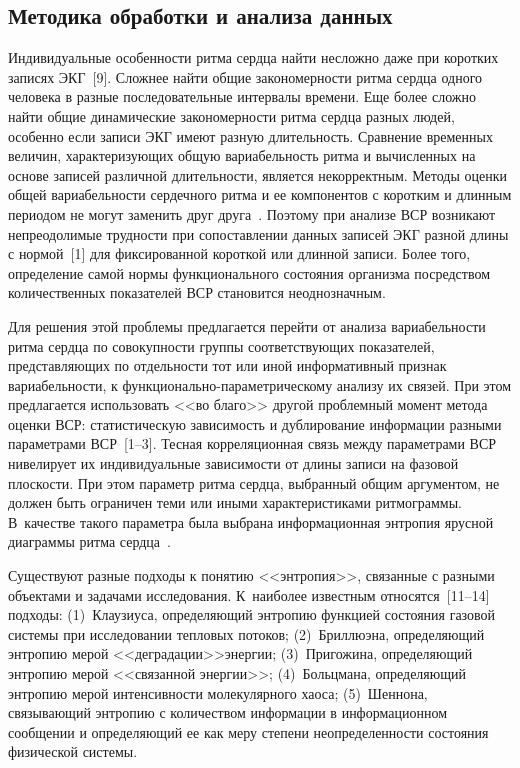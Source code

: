 \begin{multicols}{2}
\section{Методика обработки и анализа данных}
  
  Индивидуальные особенности ритма сердца найти несложно даже при 
коротких записях ЭКГ~[9]. Сложнее найти общие закономерности ритма 
сердца одного человека в разные последовательные интервалы времени. Еще 
более сложно найти общие динамические закономерности ритма сердца разных 
людей, особенно если записи ЭКГ имеют разную длительность. Сравнение 
временных величин, характеризующих общую вариабельность ритма и 
вычисленных на основе записей различной длительности, является 
некорректным. Методы оценки общей вариабельности сердечного ритма и ее 
компонентов с коротким и длинным периодом не могут заменить друг 
друга~\cite{1ku, 3ku}. Поэтому при анализе ВСР возникают непреодолимые 
трудности при сопоставлении данных записей ЭКГ разной длины с нормой~[1] 
для фиксированной короткой или длинной записи. Более того, определение 
самой нормы функционального состояния организма посредством 
количественных показателей ВСР становится неоднозначным.
  
  Для решения этой проблемы предлагается перейти от анализа 
вариабельности ритма сердца по совокупности группы соответствующих 
показателей, представляющих по отдельности тот или иной информативный 
признак вариабельности, к функционально-параметрическому анализу их 
связей. При этом предлагается использовать <<во благо>> другой проблемный 
момент метода оценки ВСР: статистическую зависимость и дублирование 
информации разными параметрами ВСР~[1--3]. Тесная корреляционная связь 
между параметрами ВСР нивелирует их индивидуальные зависимости от длины 
записи на фазовой плоскости. При этом параметр ритма сердца, выбранный 
общим аргументом, не должен быть ограничен теми или иными 
характеристиками ритмограммы. В~качестве такого параметра была выбрана 
информационная энтропия ярусной диаграммы ритма 
  сердца~\cite{3ku, 6ku, 10ku}. 
    
    Существуют разные подходы к понятию <<энтропия>>, связанные с 
разными объектами и задачами исследования. К~наиболее известным 
относятся~[11--14] подходы: (1)~Клаузиуса, определяющий энтропию функцией 
состояния газовой системы при исследовании тепловых потоков; (2)~Бриллюэна, 
определяющий энтропию мерой <<деградации>>\linebreak энергии; 
(3)~Пригожина, определяющий энтропию мерой <<связанной 
энергии>>; (4)~Больцмана, определяющий энтропию мерой 
интенсивности молекулярного хаоса; (5)~Шеннона, связывающий\linebreak 
энтропию с количеством информации в информационном сообщении и 
определяющий ее как меру степени неопределенности состояния физической 
системы.
    

\end{multicols}
